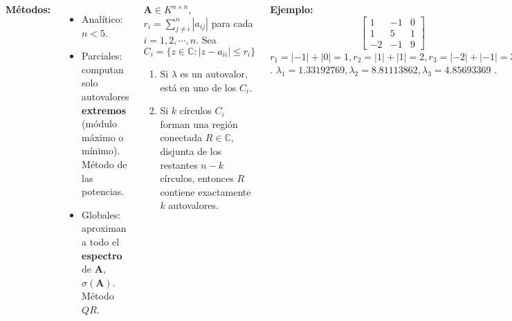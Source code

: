 \documentclass[9pt, aspectratio=169]{beamer}
\begin{document}
\begin{frame}
\begin{columns}[t]
\cx
\textbf{Métodos:}
\begin{itemize}
    \item Analítico: $n < 5$.
    \item Parciales: computan solo autovalores \textbf{extremos} (módulo máximo o mínimo). Método de las potencias.
    \item Globales: aproximan a todo el \textbf{espectro} de $\bm{A}$, $\sigma(\bm{A})$. Método $QR$.
\end{itemize}
\hrulefill \pause

\begin{theorem}
    $\bm{A} \in K^{n \times n}$, $r_i = \sum_{j \neq i}^n |a_{ij}|$ para cada $i = 1, 2, \cdots, n$. Sea
    \[ C_i = \{ z \in \mathbb{C} : |z - a_{ii}| \leq r_i \} \]
    \vspace{-2em}
    \begin{enumerate}
        \item Si $\lambda$ es un autovalor, está en uno de los $C_i$.
        \item Si $k$ círculos $C_i$ forman una región conectada $R \in \mathbb{C}$, disjunta de los restantes $n - k$ círculos, entonces $R$ contiene exactamente $k$ autovalores.
    \end{enumerate}
\end{theorem} \pause

\cx
\textbf{Ejemplo:}
\[ \begin{bmatrix}
    1 & - 1 & 0 \\
    1 & 5 & 1 \\
    -2 & -1 & 9
\end{bmatrix} \]
{\small $r_1 = |-1| + |0| = 1, r_2 = |1| + |1| = 2, r_3 = |-2| + |-1| = 3$.}
{\small $\lambda_1 = 1.33192769, \lambda_2 = 8.81113862, \lambda_3 = 4.85693369$ }.
\begin{center}
    \includegraphics[width=1.0\textwidth]{figs/circles.pdf}
\end{center}
\end{columns}
\end{frame}
\end{document}
